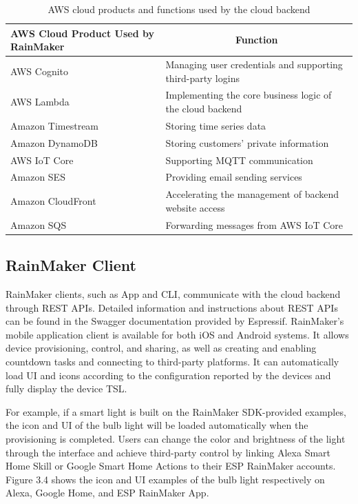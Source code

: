 \documentclass[a4paper,12pt,openany]{book}
\renewcommand{\arraystretch}{1}
\begin{document}
\begin{table}[h!]
    \renewcommand{\arraystretch}{1.4}
    \caption{AWS cloud products and functions used by the cloud backend}
    \begin{tabular}{|>{\centering}m{}|m{}|}
        \hline
        \rowcolor{LightBlue}\textbf{AWS Cloud Product Used by RainMaker}&\multicolumn{1}{c|}{\textbf{Function}}\\
        \hline
        AWS Cognito&Managing user credentials and supporting third-party logins\\
        \hline
        AWS Lambda&Implementing the core business logic of the cloud backend\\
        \hline
        Amazon Timestream&Storing time series data\\
        \hline
        Amazon DynamoDB&Storing customers’ private information\\
        \hline
        AWS IoT Core&Supporting MQTT communication\\
        \hline
        Amazon SES&Providing email sending services\\
        \hline
        Amazon CloudFront&Accelerating the management of backend website access\\
        \hline
        Amazon SQS&Forwarding messages from AWS IoT Core\\
        \hline
    \end{tabular}
\end{table}

\subsection{RainMaker Client}
RainMaker clients, such as App and CLI, communicate with the cloud backend through REST APIs. Detailed information and instructions about REST APIs can be found in the Swagger documentation provided by Espressif. RainMaker's mobile application client is available for both iOS and Android systems. It allows device provisioning, control, and sharing, as well as creating and enabling countdown tasks and connecting to third-party platforms. It can automatically load UI and icons according to the configuration reported by the devices and fully display the device TSL.

For example, if a smart light is built on the RainMaker SDK-provided examples, the icon and UI of the bulb light will be loaded automatically when the provisioning is completed. Users can change the color and brightness of the light through the interface and achieve third-party control by linking Alexa Smart Home Skill or Google Smart Home Actions to their ESP RainMaker accounts. Figure 3.4 shows the icon and UI examples of the bulb light respectively on Alexa, Google Home, and ESP RainMaker App.
\end{document}
